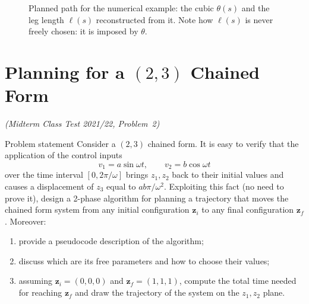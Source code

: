 \documentclass[11pt,a4paper]{article}
\theoremstyle{definition}
\theoremstyle{plain}
\theoremstyle{remark}
\newcommand{\z}{\boldsymbol{z}}
\begin{document}
\begin{figure}[H]
\centering
{}\hfill
{}
\caption{Planned path for the numerical example: the cubic $\theta(s)$ and the leg length $\ell(s)$ reconstructed from it. Note how $\ell(s)$ is never freely chosen: it is imposed by $\theta$.}
\end{figure}

\section{Planning for a $(2,3)$ Chained Form}
\label{sec:chained}
\emph{(Midterm Class Test 2021/22, Problem~2)}

\begin{problem}{Problem statement}
Consider a $(2,3)$ chained form. It is easy to verify that the application of the control inputs
\[
  v_1=a\sin\omega t,\qquad v_2=b\cos\omega t
\]
over the time interval $[0,2\pi/\omega]$ brings $z_1,z_2$ back to their initial values and causes a displacement of $z_3$ equal to $ab\pi/\omega^2$. Exploiting this fact (no need to prove it), design a 2-phase algorithm for planning a trajectory that moves the chained form system from any initial configuration $\z_i$ to any final configuration $\z_f$. Moreover:
\begin{enumerate}[label=(\alph*),nosep]
  \item provide a pseudocode description of the algorithm;
  \item discuss which are its free parameters and how to choose their values;
  \item assuming $\z_i=(0,0,0)$ and $\z_f=(1,1,1)$, compute the total time needed for reaching $\z_f$ and draw the trajectory of the system on the $z_1,z_2$ plane.
\end{enumerate}
\end{problem}
\end{document}
